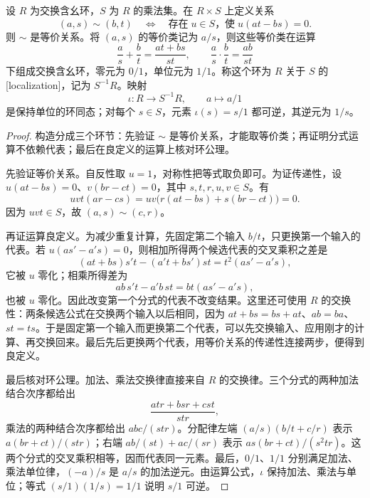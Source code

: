 \begin{theorem}\label{b1:thm:localization-construction}
	设 \(R\) 为交换含幺环，\(S\) 为 \(R\) 的乘法集。在 \(R\times S\) 上定义关系
	\[
		(a,s)\sim(b,t) \quad\Longleftrightarrow\quad \text{存在}\;u\in S\text{，使}\;u(at-bs)=0.
	\]
	则 \(\sim\) 是等价关系。将 \((a,s)\) 的等价类记为 \(a/s\)，则这些等价类在运算
	\begin{equation}\label{b1:eq:localization-operations}
		\frac as+\frac bt=\frac{at+bs}{st},\qquad \frac as\cdot\frac bt=\frac{ab}{st}
	\end{equation}
	下组成交换含幺环，零元为 \(0/1\)，单位元为 \(1/1\)。称这个环为 \(R\) 关于 \(S\) 的[localization]，记为 \(S^{-1}R\)。映射
	\[
		\iota:R\longrightarrow S^{-1}R,\qquad a\longmapsto a/1
	\]
	是保持单位的环同态；对每个 \(s\in S\)，元素 \(\iota(s)=s/1\) 都可逆，其逆元为 \(1/s\)。
\end{theorem}
\begin{proof}
	构造分成三个环节：先验证 \(\sim\) 是等价关系，才能取等价类；再证明分式运算不依赖代表；最后在良定义的运算上核对环公理。

	先验证等价关系。自反性取 \(u=1\)，对称性把等式取负即可。为证传递性，设 \(u(at-bs)=0\)、\(v(br-ct)=0\)，其中 \(s,t,r,u,v\in S\)。有
	\[
		uvt(ar-cs)=uv\bigl(r(at-bs)+s(br-ct)\bigr)=0.
	\]
	因为 \(uvt\in S\)，故 \((a,s)\sim(c,r)\)。

	再证运算良定义。为减少重复计算，先固定第二个输入 \(b/t\)，只更换第一个输入的代表。若 \(u(as'-a's)=0\)，则相加所得两个候选代表的交叉乘积之差是
	\[
		(at+bs)s't-(a't+bs')st=t^2(as'-a's),
	\]
	它被 \(u\) 零化；相乘所得差为
	\[
		ab\,s't-a'b\,st=bt(as'-a's),
	\]
	也被 \(u\) 零化。因此改变第一个分式的代表不改变结果。这里还可使用 \(R\) 的交换性：两条候选公式在交换两个输入以后相同，因为 \(at+bs=bs+at\)、\(ab=ba\)、\(st=ts\)。于是固定第一个输入而更换第二个代表，可以先交换输入、应用刚才的计算、再交换回来。最后先后更换两个代表，用等价关系的传递性连接两步，便得到良定义。

	最后核对环公理。加法、乘法交换律直接来自 \(R\) 的交换律。三个分式的两种加法结合次序都给出
	\[
		\frac{atr+bsr+cst}{str},
	\]
	乘法的两种结合次序都给出 \(abc/(str)\)。分配律左端 \((a/s)(b/t+c/r)\) 表示 \(a(br+ct)/(str)\)；右端 \(ab/(st)+ac/(sr)\) 表示 \(as(br+ct)/(s^2tr)\)。这两个分式的交叉乘积相等，因而代表同一元素。最后，\(0/1\)、\(1/1\) 分别满足加法、乘法单位律，\((-a)/s\) 是 \(a/s\) 的加法逆元。由运算公式，\(\iota\) 保持加法、乘法与单位；等式 \((s/1)(1/s)=1/1\) 说明 \(s/1\) 可逆。
\end{proof}

